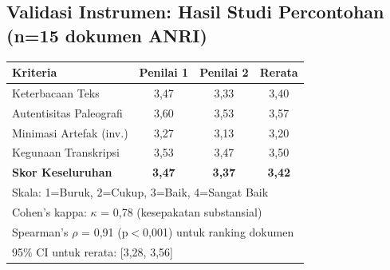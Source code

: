 \subsection*{Validasi Instrumen: Hasil Studi Percontohan (n=15 dokumen ANRI)}

\begin{table}[h!]
\centering
\tiny
\begin{tabular}{|l|c|c|c|}
\hline
\textbf{Kriteria} & \textbf{Penilai 1} & \textbf{Penilai 2} & \textbf{Rerata} \\
\hline
Keterbacaan Teks & 3,47 & 3,33 & 3,40 \\
Autentisitas Paleografi & 3,60 & 3,53 & 3,57 \\
Minimasi Artefak (inv.) & 3,27 & 3,13 & 3,20 \\
Kegunaan Transkripsi & 3,53 & 3,47 & 3,50 \\
\hline
\textbf{Skor Keseluruhan} & \textbf{3,47} & \textbf{3,37} & \textbf{3,42} \\
\hline
\multicolumn{4}{l}{\footnotesize Skala: 1=Buruk, 2=Cukup, 3=Baik, 4=Sangat Baik} \\
\multicolumn{4}{l}{\footnotesize Cohen's kappa: $\kappa$ = 0,78 (kesepakatan substansial)} \\
\multicolumn{4}{l}{\footnotesize Spearman's $\rho$ = 0,91 (p$<$0,001) untuk ranking dokumen} \\
\multicolumn{4}{l}{\footnotesize 95\% CI untuk rerata: [3,28, 3,56]} \\
\end{tabular}
\end{table}


\vspace{1em}